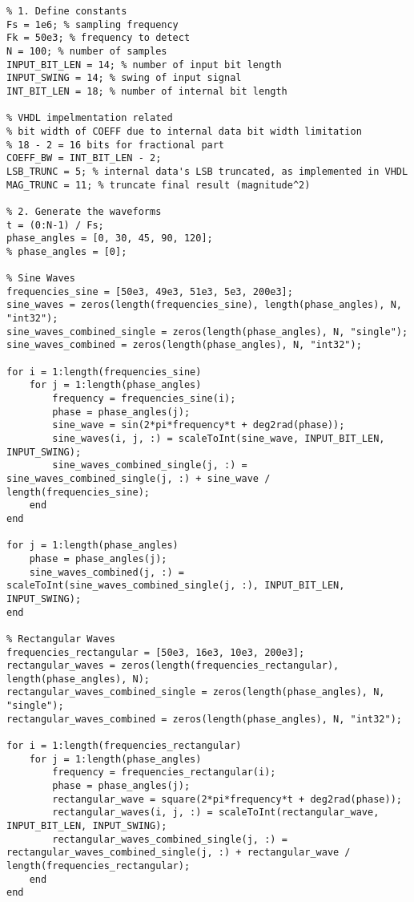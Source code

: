 \lstset{language=Matlab}
\begin{lstlisting}
% 1. Define constants
Fs = 1e6; % sampling frequency
Fk = 50e3; % frequency to detect
N = 100; % number of samples
INPUT_BIT_LEN = 14; % number of input bit length
INPUT_SWING = 14; % swing of input signal
INT_BIT_LEN = 18; % number of internal bit length

% VHDL impelmentation related
% bit width of COEFF due to internal data bit width limitation
% 18 - 2 = 16 bits for fractional part
COEFF_BW = INT_BIT_LEN - 2;
LSB_TRUNC = 5; % internal data's LSB truncated, as implemented in VHDL
MAG_TRUNC = 11; % truncate final result (magnitude^2)

% 2. Generate the waveforms
t = (0:N-1) / Fs;
phase_angles = [0, 30, 45, 90, 120];
% phase_angles = [0];

% Sine Waves
frequencies_sine = [50e3, 49e3, 51e3, 5e3, 200e3];
sine_waves = zeros(length(frequencies_sine), length(phase_angles), N, "int32");
sine_waves_combined_single = zeros(length(phase_angles), N, "single");
sine_waves_combined = zeros(length(phase_angles), N, "int32");

for i = 1:length(frequencies_sine)
    for j = 1:length(phase_angles)
        frequency = frequencies_sine(i);
        phase = phase_angles(j);
        sine_wave = sin(2*pi*frequency*t + deg2rad(phase));
        sine_waves(i, j, :) = scaleToInt(sine_wave, INPUT_BIT_LEN, INPUT_SWING);
        sine_waves_combined_single(j, :) = sine_waves_combined_single(j, :) + sine_wave / length(frequencies_sine);
    end
end

for j = 1:length(phase_angles)
    phase = phase_angles(j);
    sine_waves_combined(j, :) = scaleToInt(sine_waves_combined_single(j, :), INPUT_BIT_LEN, INPUT_SWING);
end

% Rectangular Waves
frequencies_rectangular = [50e3, 16e3, 10e3, 200e3];
rectangular_waves = zeros(length(frequencies_rectangular), length(phase_angles), N);
rectangular_waves_combined_single = zeros(length(phase_angles), N, "single");
rectangular_waves_combined = zeros(length(phase_angles), N, "int32");

for i = 1:length(frequencies_rectangular)
    for j = 1:length(phase_angles)
        frequency = frequencies_rectangular(i);
        phase = phase_angles(j);
        rectangular_wave = square(2*pi*frequency*t + deg2rad(phase));
        rectangular_waves(i, j, :) = scaleToInt(rectangular_wave, INPUT_BIT_LEN, INPUT_SWING);
        rectangular_waves_combined_single(j, :) = rectangular_waves_combined_single(j, :) + rectangular_wave / length(frequencies_rectangular);
    end
end


\end{lstlisting}

